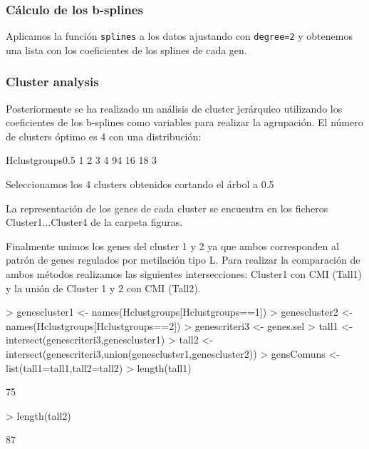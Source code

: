 \documentclass[a4paper,10pt]{article}
\begin{document}
\subsubsection{Cálculo de los b-splines}

Aplicamos la función \verb|splines| a los datos ajustando con \verb|degree=2| y obtenemos una lista con los coeficientes de los splines de cada gen. 

\subsubsection{Cluster analysis}
Posteriormente se ha realizado un análisis de cluster jerárquico utilizando los coeficientes  de los b-splines como variables para realizar la agrupación. El número de clusters óptimo es 4 con una distribución:
\begin{Schunk}
\begin{Soutput}
Hclustgroups0.5
 1  2  3  4 
94 16 18  3 
\end{Soutput}
\end{Schunk}

Seleccionamos los 4 clusters obtenidos cortando el árbol a 0.5


\begin{center}
La representación de los genes de cada cluster se encuentra  en los ficheros Cluster1...Cluster4 de la carpeta figuras.
\end{center}

Finalmente unimos los genes del cluster 1 y 2 ya que ambos corresponden al patrón de genes regulados por metilación tipo L. 
Para realizar la comparación de ambos métodos realizamos las siguientes intersecciones: Cluster1 con CMI (Tall1) y la unión de Cluster 1 y 2 con CMI (Tall2).
\begin{Schunk}
\begin{Sinput}
> genescluster1 <- names(Hclustgroups[Hclustgroups==1])
> genescluster2 <- names(Hclustgroups[Hclustgroups==2])
> genescriteri3 <- genes.sel
> tall1 <- intersect(genescriteri3,genescluster1)
> tall2 <- intersect(genescriteri3,union(genescluster1,genescluster2))
> gensComuns <- list(tall1=tall1,tall2=tall2)
> length(tall1)
\end{Sinput}
\begin{Soutput}
[1] 75
\end{Soutput}
\begin{Sinput}
> length(tall2)
\end{Sinput}
\begin{Soutput}
[1] 87
\end{Soutput}
\end{Schunk}
\end{document}
